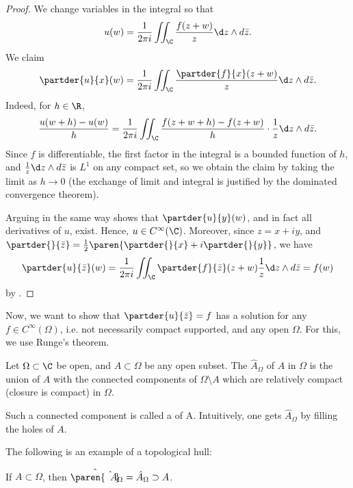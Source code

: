 \documentclass[11pt]{report}
\begin{document}
\begin{proof}
    We change variables in the integral so that
    $$u(w) = \frac{1}{2\pi i } \iint _\C \frac{f(z+w)}{z}\d z\land d \bar z.$$
    We claim $$\partder{u}{x}(w) =\frac{1}{2\pi i }\iint _\C \frac{\partder{f}{x}(z+w)}{z}\d z \land d \bar z.$$
    Indeed, for $h \in \R$,
    $$\frac{u(w+h)-u(w)}{h}=\frac{1}{2\pi i}\iint_\C \frac{f(z+w+h)-f(z+w)}{h}\cdot \frac{1}{z} \d z \land d \bar z.$$
    Since $f$ is differentiable, the first factor in the integral is a bounded function of $h$, and $\frac{1}{z}\d z \land d\bar z$ is $L^1$ on any compact set, so we obtain the claim by taking the limit as $h \to 0$ (the exchange of limit and integral is justified by the dominated convergence theorem).

    Arguing in the same way shows that $\partder{u}{y}(w) $, and in fact all derivatives of $u$, exist. Hence, $u \in C^\infty (\C)$. Moreover, since $z=x+iy$, and $\partder{}{\bar z}=\frac{1}{2}\paren{\partder{}{x}+i\partder{}{y}}$, we have
    $$\partder{u}{\bar z}(w) = \frac{1}{2 \pi i} \iint_\C \partder{f}{\bar z}(z+w)\frac{1}{z}\d z \land d \bar z = f(w)$$
    by .
\end{proof}

Now, we want to show that $\partder{u}{\bar z}=f$ has a solution for any $f\in C^\infty (\Omega)$, i.e. not necessarily compact supported, and any open $\Omega$. For this, we use Runge's theorem.

\begin{defn}
    Let $\Omega \subset \C$ be open, and $A \subset \Omega$ be any open subset. The  $\hat A_\Omega$ of $A$ in $\Omega$ is the union of $A$ with the connected components of $\Omega \setminus A$ which are relatively compact (closure is compact) in $\Omega$.

    Such a connected component is called a  of A. Intuitively, one gets $\hat A_\Omega$ by filling the holes of $A$.
\end{defn}

\begin{ex}
The following is an example of a topological hull:

\end{ex}

\begin{exercise}
    If $A \subset \Omega$, then $\hat{\paren{\hat{A}}}_\Omega=\hat A_\Omega \supset A$.
\end{exercise}
\end{document}

